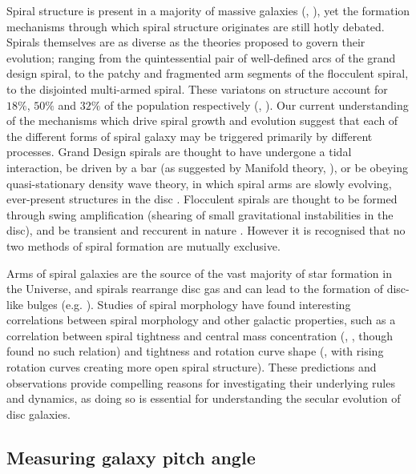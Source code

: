 

Spiral structure is present in a majority of massive galaxies (\citealt{1989gadv.book..151B}, \citealt{2008MNRAS.389.1179L}), yet the formation mechanisms through which spiral structure originates are still hotly debated. Spirals themselves are as diverse as the theories proposed to govern their evolution; ranging from the quintessential pair of well-defined arcs of the grand design spiral, to the patchy and fragmented arm segments of the flocculent spiral, to the disjointed multi-armed spiral. These variatons on structure account for $18\%$, $50\%$ and $32\%$ of the population respectively (\citealt{2011ApJ...737...32E}, \citealt{2015yCat..22170032B}). Our current understanding of the mechanisms which drive spiral growth and evolution suggest that each of the different forms of spiral galaxy may be triggered primarily by different processes. Grand Design spirals are thought to have undergone a tidal interaction, be driven by a bar (as suggested by Manifold theory, \citealt{2011hsa6.conf..548R}), or be obeying quasi-stationary density wave theory, in which spiral arms are slowly evolving, ever-present structures in the disc \citep{1964ApJ...140..646L}. Flocculent spirals are thought to be formed through swing amplification (shearing of small gravitational instabilities in the disc), and be transient and reccurent in nature \citep{1966ApJ...146..810J}. However it is recognised that no two methods of spiral formation are mutually exclusive.

Arms of spiral galaxies are the source of the vast majority of star formation in the Universe, and spirals rearrange disc gas and can lead to the formation of disc-like bulges (e.g. \citealt{2004ARA&A..42..603K}). Studies of spiral morphology have found interesting correlations between spiral morphology and other galactic properties, such as a correlation between spiral tightness and central mass concentration (\citealt{2019ApJ...871..194Y}, \citealt{2015PhDT........14D}, though \citealt{2017MNRAS.472.2263H} found no such relation) and tightness and rotation curve shape (\citealt{2005MNRAS.359.1065S}, with rising rotation curves creating more open spiral structure). These predictions and observations provide compelling reasons for investigating their underlying rules and dynamics, as doing so is essential for understanding the secular evolution of disc galaxies.

\subsection{Measuring galaxy pitch angle}


